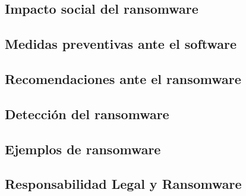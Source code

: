 \documentclass[12pt,a4paper]{article}
\begin{document}
\subsection{Impacto social del ransomware}                               %
\newpage                                                                 %
\subsection{Medidas preventivas ante el software}                        %
\subsection{Recomendaciones ante el ransomware}                          %
\subsection{Detección del ransomware}                                    %
\subsection{Ejemplos de ransomware}                                      %
\subsection{Responsabilidad Legal y Ransomware}                          %
\end{document}
